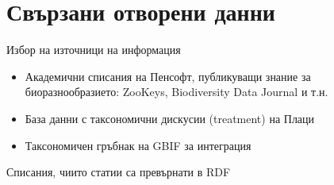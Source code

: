 \documentclass[bulgarian]{beamer}
\begin{document}
\section{Свързани отворени данни}

\begin{frame}{Избор на източници на информация}
\begin{itemize}
    \item Академични списания на Пенсофт, публикуващи знание за биоразнообразието: ZooKeys, Biodiversity Data Journal и т.н.
    \item База данни с таксономични дискусии (treatment) на Плаци
    \item Таксономичен гръбнак на GBIF за интеграция
\end{itemize}
\end{frame}

\begin{frame}{Списания, чиито статии  са превърнати в RDF}
    
   
\end{frame}
\end{document}
